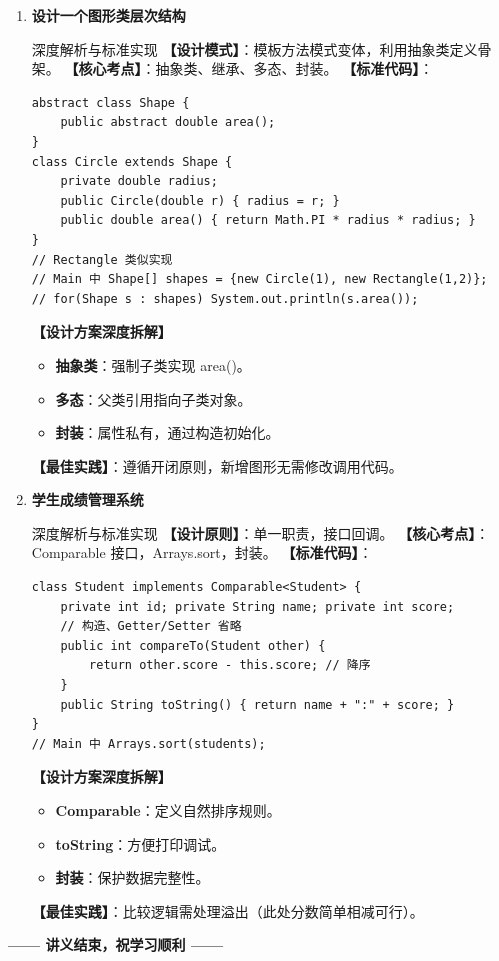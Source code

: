 ﻿\documentclass[12pt, a4paper]{ctexart}
\begin{document}
\begin{enumerate}[label=\textbf{\arabic*.}, itemsep=1em]
	\item \textbf{设计一个图形类层次结构}
	      \begin{bluebox}{深度解析与标准实现}
		      \textbf{【设计模式】}：模板方法模式变体，利用抽象类定义骨架。
		      \textbf{【核心考点】}：抽象类、继承、多态、封装。
		      \textbf{【标准代码】}：
		      \begin{lstlisting}[style=JavaExam]
abstract class Shape {
    public abstract double area();
}
class Circle extends Shape {
    private double radius;
    public Circle(double r) { radius = r; }
    public double area() { return Math.PI * radius * radius; }
}
// Rectangle 类似实现
// Main 中 Shape[] shapes = {new Circle(1), new Rectangle(1,2)};
// for(Shape s : shapes) System.out.println(s.area());
    \end{lstlisting}
		      \textbf{【设计方案深度拆解】}
		      \begin{itemize}[leftmargin=*, nosep]
			      \item \textbf{抽象类}：强制子类实现 area()。
			      \item \textbf{多态}：父类引用指向子类对象。
			      \item \textbf{封装}：属性私有，通过构造初始化。
		      \end{itemize}
		      \textbf{【最佳实践】}：遵循开闭原则，新增图形无需修改调用代码。
	      \end{bluebox}

	\item \textbf{学生成绩管理系统}
	      \begin{bluebox}{深度解析与标准实现}
		      \textbf{【设计原则】}：单一职责，接口回调。
		      \textbf{【核心考点】}：Comparable 接口，Arrays.sort，封装。
		      \textbf{【标准代码】}：
		      \begin{lstlisting}[style=JavaExam]
class Student implements Comparable<Student> {
    private int id; private String name; private int score;
    // 构造、Getter/Setter 省略
    public int compareTo(Student other) {
        return other.score - this.score; // 降序
    }
    public String toString() { return name + ":" + score; }
}
// Main 中 Arrays.sort(students);
    \end{lstlisting}
		      \textbf{【设计方案深度拆解】}
		      \begin{itemize}[leftmargin=*, nosep]
			      \item \textbf{Comparable}：定义自然排序规则。
			      \item \textbf{toString}：方便打印调试。
			      \item \textbf{封装}：保护数据完整性。
		      \end{itemize}
		      \textbf{【最佳实践】}：比较逻辑需处理溢出（此处分数简单相减可行）。
	      \end{bluebox}
\end{enumerate}

\vfill
\begin{center}
	\bfseries —— 讲义结束，祝学习顺利 ——
\end{center}
\end{document}
